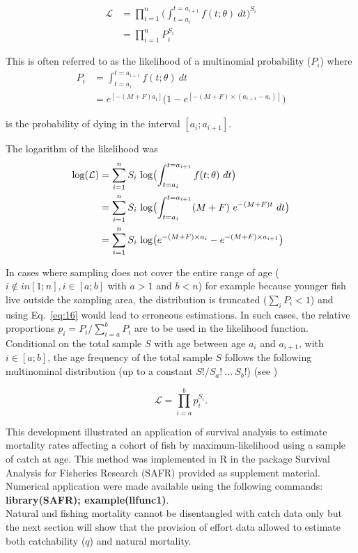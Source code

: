 \begin{align}
\mathcal{L}  &= \prod_{i=1}^{n} \bigl ( \int_{t=a_{i}}^{t=a_{i+1}} f(t; \theta) \ dt \bigr ) ^ {S_{i}} \\
            &= \prod_{i=1}^{n} P_{i} ^ {S_{i}}
\end{align}

This is often referred to as the likelihood of a multinomial probability ($P_{i}$) where 
\begin{align}
P_{i} &= \int_{t=a_{i}}^{t=a_{i+1}} f(t; \theta) \ dt \\
     &= e^{[-(M+F) a_{i}]} \bigl ( 1 - e^{[- (M+F) \times (a_{i+1} - a_{i})]}  \bigr )
\end{align}

is the probability of dying in the interval $[a_{i}; a_{i+1}]$.

The logarithm of the likelihood was
\begin{align}
 {\rm log}(\mathcal{L}) &= \sum_{i=1}^{n} S_{i} \ {\rm log} \bigl ( \int_{t=a_{i}}^{t=a_{i+1}} f(t; \theta) \ dt \bigr ) \\
                        &= \sum_{i=1}^{n} S_{i} \ {\rm log} \bigl ( \int_{t=a_{i}}^{t=a_{i+1}} (M + F) \ e^{-(M+F)t} \ dt \bigr ) \\
                        &= \sum_{i=1}^{n} S_{i} \ {\rm log} \bigl ( e^{-(M+F) \times a_{i}} - e^{-(M+F) \times a_{i+1}} \bigr ) \\
\label{eq:16}
\end{align}

In cases where sampling does not cover the entire range of age ($ i \notin in [1;n], i \in [a;b]$ with $a > 1$ and $b < n$) for example because younger fish live outside the sampling area, the distribution is truncated ($\sum_{i} P_i < 1$) and using Eq.~\ref{eq:16} would lead to erroneous estimations. In such cases, the relative proportions $p_i=P_{i} / \sum_{i=a}^{b} P_{i}$ are to be used in the likelihood function. Conditional on the total sample $S$ with age between age $a_i$ and $a_{i+1}$, with $i \in [a;b]$, the age frequency of the total sample $S$ follows the following multinominal distribution (up to a constant $S!/S_a! \ ... \ S_b!$) (see \cite{Wang99a})

\begin{equation}
\mathcal{L} = \prod_{i=a}^{b} p_{i} ^ {S_{i}}.
\end{equation}

This development illustrated an application of survival analysis to estimate mortality rates affecting a cohort of fish by maximum-likelihood using a sample of catch at age. This method was implemented in R \citep{R} in the package Survival Analysis for Fisheries Research (SAFR) provided as supplement material. Numerical application were made available using the following commands: {\bf library(SAFR); example(llfunc1)}.\\

Natural and fishing mortality cannot be disentangled with catch data only but the next section will show that the provision of effort data allowed to estimate both catchability ($q$) and natural mortality. 
